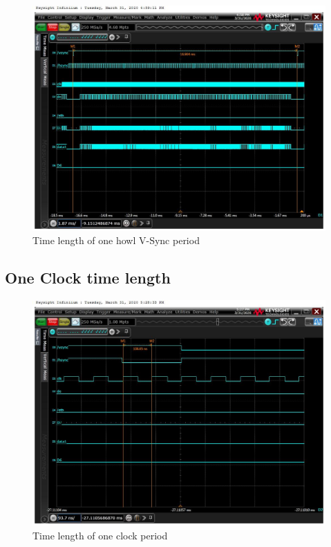 \begin{figure}[ht]
\begin{center}
    \includegraphics[width=13cm]{pictures/lcd_timings/vsync_periode.jpg}
\end{center}
\caption{Time length of one howl V-Sync period}
\label{fig:one_vsync_period}
\end{figure}



\subsection{One Clock time length}%
\label{sub:Time length one Clock}


\begin{figure}[ht]
\begin{center}
    \includegraphics[width=13cm]{pictures/lcd_timings/periode_time_1clk.jpg}
\end{center}
\caption{Time length of one clock period}
\label{fig:one_clock_time}
\end{figure}



